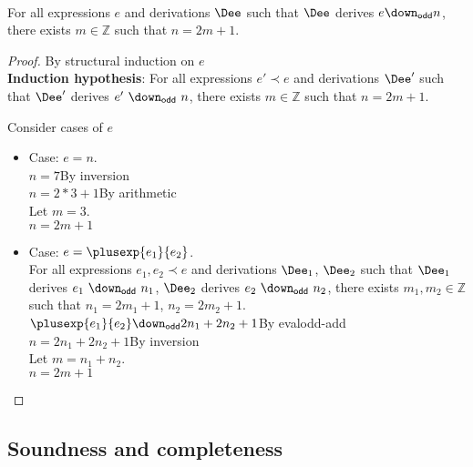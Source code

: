 \begin{conjecture} ~\\
  For all expressions $e$ and derivations $\Dee$ such that $\Dee$ derives $e \downodd n$,\\
  there exists $m \in \mathbb{Z}$ such that $n = 2m + 1$.
\end{conjecture}
\begin{proof}
  By structural induction on $e$
  \vspace{1ex} 
  \\
  \textbf{Induction hypothesis}:
  For all expressions $e'\prec{e}$ and derivations $\Dee'$ such that $\Dee'$ derives $e'~\downodd~n$, there exists $m\in\mathbb{Z}$ such that $n = 2m + 1$.
  \vspace{2ex}

  Consider cases of $e$

  \begin{itemize}
  \item Case: $e = n$.\\
  $n = 7$\hspace{10mm}By inversion\\
  $n = 2*3 + 1$\hspace{10mm}By arithmetic\\
  Let $m = 3$.\\
  $n = 2m + 1$\\
  
  \item Case: $e = \plusexp{e_1}{e_2}$.\\
  For all expressions $e_1, e_2\prec{e}$ and derivations $\Dee_1$, $\Dee_2$ such that $\Dee_1$ derives $e_1~\downodd~n_1$, $\Dee_2$ derives $e_2~\downodd~n_2$, there exists $m_1, m_2\in\mathbb{Z}$ such that $n_1 = 2m_1 + 1$, $n_2 = 2m_2 + 1$.\\
  $\plusexp{e_1}{e_2}\downodd 2n_1+2n_2+1$\hspace{10mm}By evalodd-add\\
  $n = 2n_1+2n_2+1$\hspace{10mm}By inversion\\
  Let $m = n_1 + n_2$.\\
  $n = 2m + 1$\\
  \end{itemize}
    \vfill
\end{proof}

\subsection*{Soundness and completeness}

